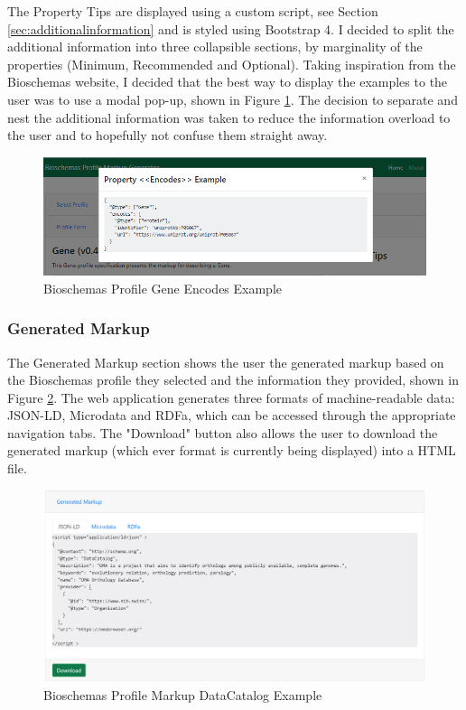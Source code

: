 {
\newpage
The Property Tips are displayed using a custom script, see Section \ref{sec:additionalinformation} and is styled using Bootstrap 4. I decided to split the additional information into three collapsible sections, by marginality of the properties (Minimum, Recommended and Optional). Taking inspiration from the Bioschemas website, I decided that the best way to display the examples to the user was to use a modal pop-up, shown in Figure \ref{fig:geneEncodesExample}. The decision to separate and nest the additional information was taken to reduce the information overload to the user and to hopefully not confuse them straight away.\newline

\begin{figure}[!h]
 \centering\includegraphics[scale=0.45]{images/system/propertyExample.PNG}
   \caption{Bioschemas Profile Gene Encodes Example}
   \label{fig:geneEncodesExample}
\end{figure}

\subsubsection*{Generated Markup}
The Generated Markup section shows the user the generated markup based on the Bioschemas profile they selected and the information they provided, shown in Figure \ref{fig:generatedMarkup}. The web application generates three formats of machine-readable data: JSON-LD, Microdata and RDFa, which can be accessed through the appropriate navigation tabs. The "Download" button also allows the user to download the generated markup (which ever format is currently being displayed) into a HTML file.\newline

\begin{figure}[!h]
 \centering\includegraphics[scale=0.39]{images/system/GeneratedData.PNG}
   \caption{Bioschemas Profile Markup DataCatalog Example}
   \label{fig:generatedMarkup}
\end{figure}

}

